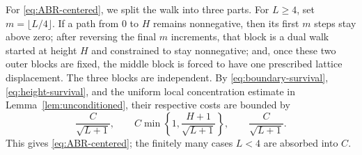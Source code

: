 \documentclass[11pt]{article}
\theoremstyle{plain}
\theoremstyle{definition}
\theoremstyle{remark}
\begin{document}
For \eqref{eq:ABR-centered}, we split the walk into three parts. For
\(L\ge4\), set \(m=\lfloor L/4\rfloor\). If a path from \(0\) to
\(H\) remains nonnegative, then its first \(m\) steps stay above zero; after
reversing the final \(m\) increments, that block is a dual walk started at
height \(H\) and constrained to stay nonnegative; and, once these two outer
blocks are fixed, the middle block is forced to have one prescribed
lattice displacement. The three blocks are independent. By
\eqref{eq:boundary-survival}, \eqref{eq:height-survival}, and the uniform
local concentration estimate in Lemma~\ref{lem:unconditioned}, their
respective costs are bounded by
\[
 \frac{C}{\sqrt{L+1}},\qquad
 C\min\left\{1,\frac{H+1}{\sqrt{L+1}}\right\},\qquad
 \frac{C}{\sqrt{L+1}}.
\]
This gives \eqref{eq:ABR-centered}; the finitely many cases \(L<4\) are
absorbed into \(C\).
\end{document}
